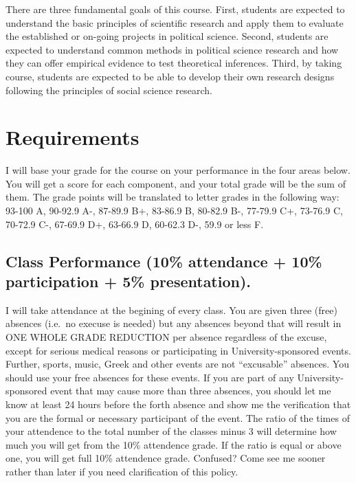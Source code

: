 \documentclass[11pt,]{article}
\theoremstyle{definition}
\theoremstyle{definition}
\theoremstyle{remark}
\begin{document}
There are three fundamental goals of this course. First, students are
expected to understand the basic principles of scientific research and
apply them to evaluate the established or on-going projects in political
science. Second, students are expected to understand common methods in
political science research and how they can offer empirical evidence to
test theoretical inferences. Third, by taking course, students are
expected to be able to develop their own research designs following the
principles of social science research.

\section{Requirements}\label{requirements}

I will base your grade for the course on your performance in the four
areas below. You will get a score for each component, and your total
grade will be the sum of them. The grade points will be translated to
letter grades in the following way: 93-100 A, 90-92.9 A-, 87-89.9 B+,
83-86.9 B, 80-82.9 B-, 77-79.9 C+, 73-76.9 C, 70-72.9 C-, 67-69.9 D+,
63-66.9 D, 60-62.3 D-, 59.9 or less F.

\subsection{Class Performance (10\% attendance + 10\% participation +
5\%
presentation).}\label{class-performance-10-attendance-10-participation-5-presentation.}

I will take attendance at the begining of every class. You are given
three (free) absences (i.e.~no execuse is needed) but any absences
beyond that will result in ONE WHOLE GRADE REDUCTION per absence
regardless of the excuse, except for serious medical reasons or
participating in University-sponsored events. Further, sports, music,
Greek and other events are not ``excusable'' absences. You should use
your free absences for these events. If you are part of any
University-sponsored event that may cause more than three absences, you
should let me know at least 24 hours before the forth absence and show
me the verification that you are the formal or necessary participant of
the event. The ratio of the times of your attendence to the total number
of the classes minus 3 will determine how much you will get from the
10\% attendence grade. If the ratio is equal or above one, you will get
full 10\% attendence grade. Confused? Come see me sooner rather than
later if you need clarification of this policy.
\end{document}
